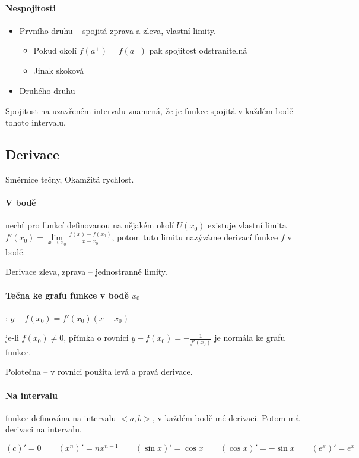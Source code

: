 \documentclass[a4paper, 11pt]{report}
\begin{document}
\paragraph{Nespojitosti}
\begin{itemize}
	\item Prvního druhu -- spojitá zprava a zleva, vlastní limity.
	\begin{itemize}
		\item Pokud okolí $f(a^+) = f(a^-)$ pak spojitost odstranitelná
		\item Jinak skoková
	\end{itemize}
	\item Druhého druhu
\end{itemize}

Spojitost na uzavřeném intervalu znamená, že je funkce spojitá v každém bodě tohoto intervalu.

\subsection{Derivace}
Směrnice tečny, Okamžitá rychlost.

\paragraph{V bodě} nechť pro funkcí definovanou na nějakém okolí $U(x_0)$ existuje vlastní limita $f'(x_0) = \lim\limits_{x \to x_0} \frac{f(x) - f(x_0)}{x - x_0}$, potom tuto limitu nazýváme derivací funkce $f$ v bodě.

Derivace zleva, zprava -- jednostranné limity.

\paragraph{Tečna ke grafu funkce v bodě $x_0$}: $y-f(x_0) = f'(x_0) (x-x_0)$

je-li $f(x_0) \neq 0$, přímka o rovnici $y - f(x_0) = - \frac{1}{f'(x_0)}$ je normála ke grafu funkce.

Polotečna -- v rovnici použita levá a pravá derivace.

\paragraph{Na intervalu}
funkce definována na intervalu $<a, b>$, v každém bodě mé derivaci. Potom má derivaci na intervalu.

$(c)' = 0 \qquad
(x^n)' = nx^{n-1} \qquad
(\sin{x})' = \cos{x} \qquad
(\cos{x})' = - \sin{x} \qquad
(e^x)' = e^x$
\end{document}
